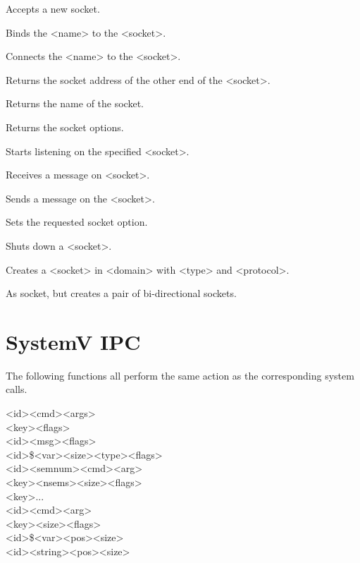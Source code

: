 \begin{enum}{1cm}

Accepts a new socket.

Binds the <name> to the <socket>.

Connects the <name> to the <socket>.

Returns the socket address of the other end of the <socket>.

Returns the name of the socket.

Returns the socket options.

Starts listening on the specified <socket>.

Receives a message on <socket>.

Sends a message on the <socket>.

Sets the requested socket option.

Shuts down a <socket>.

Creates a <socket> in <domain> with <type> and <protocol>.

As socket, but creates a pair of bi-directional sockets.

\end{enum}
\section{SystemV IPC} 

The following functions all perform the same action as the
corresponding system calls.

<id>\kwd{,}<cmd>\kwd{,}<args>\kwd{)} \\
<key>\kwd{,}<flags>\kwd{)} \\
<id>\kwd{,}<msg>\kwd{,}<flags>\kwd{)} \\
<id>\kwd{,}\$<var>\kwd{,}<size>\kwd{,}<type>\kwd{,}<flags>\kwd{)} \\
<id>\kwd{,}<semnum>\kwd{,}<cmd>\kwd{,}<arg>\kwd{)} \\
<key>\kwd{,}<nsems>\kwd{,}<size>\kwd{,}<flags>\kwd{)} \\
<key>\kwd{,}...\kwd{)} \\
<id>\kwd{,}<cmd>\kwd{,}<arg>\kwd{)} \\
<key>\kwd{,}<size>\kwd{,}<flags>\kwd{)} \\
<id>\kwd{,}\$<var>\kwd{,}<pos>\kwd{,}<size>\kwd{)} \\
<id>\kwd{,}<string>\kwd{,}<pos>\kwd{,}<size>\kwd{)}
\makeuppage
